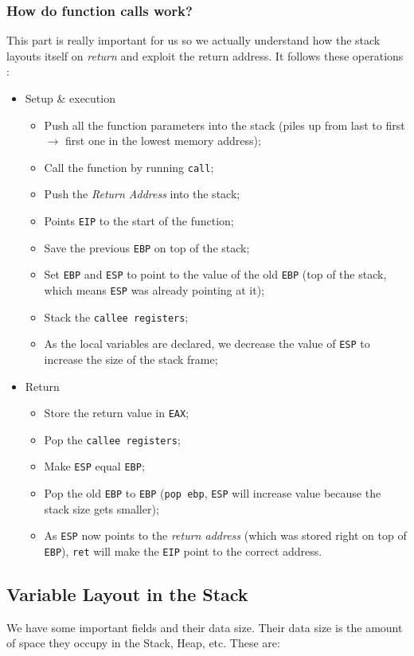 \documentclass[11pt]{article}
\begin{document}
\subsubsection{How do function calls work?}
\label{sec:org7f67ebc}
This part is really important for us so we actually understand how the stack layouts itself on \emph{return} and exploit the return address. It follows these operations \cite{functionCall}:

\begin{itemize}
\item Setup \& execution
\begin{itemize}
\item Push all the function parameters into the stack (piles up from last to first \(\to\) first one in the lowest memory address);
\item Call the function by running \texttt{call};
\item Push the \emph{Return Address} into the stack;
\item Points \texttt{EIP} to the start of the function;
\item Save the previous \texttt{EBP} on top of the stack;
\item Set \texttt{EBP} and \texttt{ESP} to point to the value of the old \texttt{EBP} (top of the stack, which means \texttt{ESP} was already pointing at it);
\item Stack the \texttt{callee registers};
\item As the local variables are declared, we decrease the value of \texttt{ESP} to increase the size of the stack frame;
\end{itemize}
\item Return 
\begin{itemize}
\item Store the return value in \texttt{EAX};
\item Pop the \texttt{callee registers};
\item Make \texttt{ESP} equal \texttt{EBP};
\item Pop the old \texttt{EBP} to \texttt{EBP} (\texttt{pop ebp}, \texttt{ESP} will increase value because the stack size gets smaller);
\item As \texttt{ESP} now points to the \emph{return address} (which was stored right on top of \texttt{EBP}), \texttt{ret} will make the \texttt{EIP} point to the correct address.
\end{itemize}
\end{itemize}

\subsection{Variable Layout in the Stack}
\label{sec:orgc7237fb}
\label{sec:VarLayoutStack}
We have some important fields and their data size. Their data size is the amount of space they occupy in the Stack, Heap, etc. These are:
\end{document}
